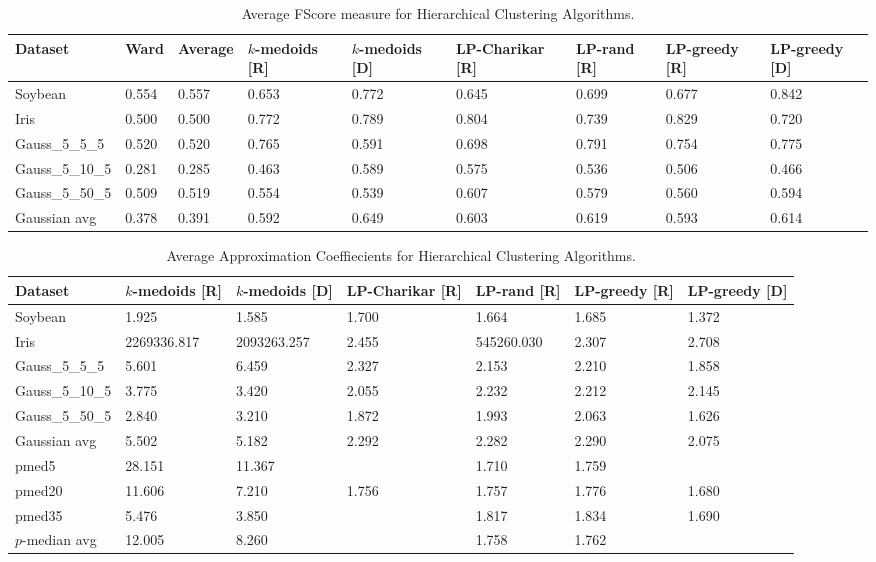 \documentclass[conference, 10pt, final]{IEEEtran}
\begin{document}
\begin{table}[!t]
\label{fig:hier_results_FScore}
\caption{Average FScore measure for Hierarchical Clustering Algorithms.}
\centering
\begin{tabular}{ | l | l | l | l | l | l | l | l| l| }
\hline
Dataset	&	Ward	&	Average	&	$k$-medoids [R]	&	$k$-medoids [D]	&	LP-Charikar [R]	&	LP-rand [R]	&	LP-greedy [R]	&	LP-greedy [D]	\\ \hline
Soybean	&	0.554	&	0.557	&	0.653	&	0.772	&	0.645	&	0.699	&	0.677	&	0.842	\\
Iris	&	0.500	&	0.500	&	0.772	&	0.789	&	0.804	&	0.739	&	0.829	&	0.720	\\
Gauss\_5\_5\_5	&	0.520	&	0.520	&	0.765	&	0.591	&	0.698	&	0.791	&	0.754	&	0.775	\\
Gauss\_5\_10\_5	&	0.281	&	0.285	&	0.463	&	0.589	&	0.575	&	0.536	&	0.506	&	0.466	\\
Gauss\_5\_50\_5	&	0.509	&	0.519	&	0.554	&	0.539	&	0.607	&	0.579	&	0.560	&	0.594	\\
Gaussian avg	&	0.378	&	0.391	&	0.592	&	0.649	&	0.603	&	0.619	&	0.593	&	0.614	\\ \hline
\end{tabular}
\end{table}


\begin{table}[!t]
\label{fig:hier_results_approx}
\caption{Average Approximation Coeffiecients for Hierarchical Clustering Algorithms.}
\centering
\begin{tabular}{ | l | l | l | l | l | l| l|}
\hline
Dataset	&	$k$-medoids [R]	&	$k$-medoids [D]	&	LP-Charikar [R]	&	LP-rand [R]	&	LP-greedy [R]	&	LP-greedy [D]	\\ \hline
Soybean	&	1.925	&	1.585	&	1.700	&	1.664	&	1.685	&	1.372	\\
Iris	&	2269336.817	&	2093263.257	&	2.455	&	545260.030	&	2.307	&	2.708	\\
Gauss\_5\_5\_5	&	5.601	&	6.459	&	2.327	&	2.153	&	2.210	&	1.858	\\
Gauss\_5\_10\_5	&	3.775	&	3.420	&	2.055	&	2.232	&	2.212	&	2.145	\\
Gauss\_5\_50\_5	&	2.840	&	3.210	&	1.872	&	1.993	&	2.063	&	1.626	\\
Gaussian avg	&	5.502	&	5.182	&	2.292	&	2.282	&	2.290	&	2.075	\\
pmed5	&	28.151	&	11.367	&		&	1.710	&	1.759	&		\\
pmed20	&	11.606	&	7.210	&	1.756	&	1.757	&	1.776	&	1.680	\\
pmed35	&	5.476	&	3.850	&		&	1.817	&	1.834	&	1.690	\\
$p$-median avg	&	12.005	&	8.260	&		&	1.758	&	1.762	&		\\ \hline
\end{tabular}
\end{table}
\end{document}
